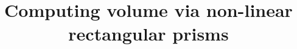 \documentclass{article}
\theoremstyle{theorem}
\theoremstyle{definition}
\begin{document}
\title{Computing volume via non-linear rectangular prisms}

\maketitle


\end{document}
